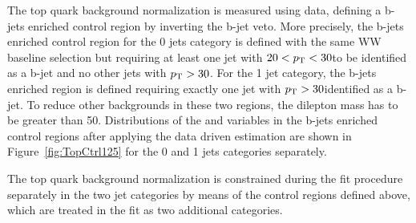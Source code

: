 The top quark background normalization is measured using data, defining a b-jets enriched control region by inverting the b-jet veto. More precisely, the b-jets enriched control region for the 0 jets category is defined with the same WW baseline selection but requiring at least one jet with $20<p_\mathrm{T}<30$\GeV to be identified as a b-jet and no other jets with $p_\mathrm{T} > 30$\GeV. For the 1 jet category, the b-jets enriched region is defined requiring exactly one jet with $p_\mathrm{T}>30$\GeV identified as a b-jet.
To reduce other backgrounds in these two regions, the dilepton mass has to be greater than 50\GeV. Distributions of the \mll and \mt variables in the b-jets enriched control regions after applying the data driven estimation are shown in Figure~\ref{fig:TopCtrl125} for the 0 and 1 jets categories separately.

The top quark background normalization is constrained during the fit procedure separately in the two jet categories by means of the control regions defined above, which are treated in the fit as two additional categories. 


